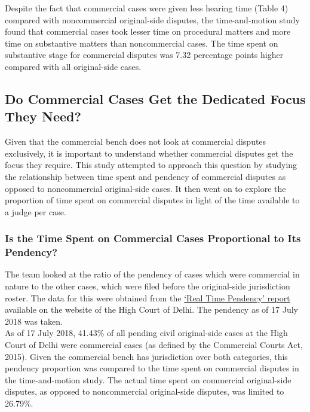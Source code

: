 \documentclass[a4paper, 12pt, twoside]{article}
\begin{document}
Despite the fact that commercial cases were given less hearing time (Table 4) compared with noncommercial original-side disputes, the time-and-motion study found that commercial cases took lesser time on procedural matters and more time on substantive matters than noncommercial cases. The time spent on substantive stage for commercial disputes was 7.32 percentage points higher compared with all original-side cases.

\subsection{Do Commercial Cases Get the Dedicated Focus They Need?}
Given that the commercial bench does not look at commercial disputes exclusively, it is important to understand whether commercial disputes get the focus they require. This study attempted to approach this question by studying the relationship between time spent and pendency of commercial disputes as opposed to noncommercial original-side cases. It then went on to explore the proportion of time spent on commercial disputes in light of the time available to a judge per case.

\subsubsection{Is the Time Spent on Commercial Cases Proportional to Its Pendency?}
The team looked at the ratio of the pendency of cases which were commercial in nature to the other cases, which were filed before the original-side jurisdiction roster. The data for this were obtained from the \href{http://delhihighcourt.nic.in/instdisp.asp}{‘Real Time Pendency’ report} available on the website of the High Court of Delhi. 
The pendency as of 17 July 2018 was taken.\\

As of 17 July 2018, 41.43\% of all pending civil original-side cases at the High Court of Delhi were commercial cases (as defined by the Commercial Courts Act, 2015). Given the commercial bench has jurisdiction over both categories, this pendency proportion was compared to the time spent on commercial disputes in the time-and-motion study. The actual time spent on commercial original-side disputes, as opposed to noncommercial original-side disputes, was limited to 26.79\%. 
 
\end{document}
